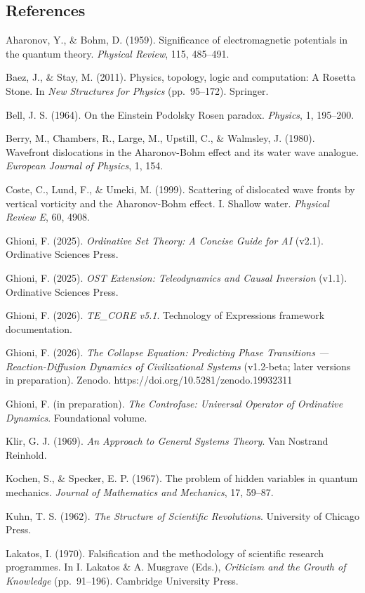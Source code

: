 \documentclass[
  11pt,
  a4paper,
]{article}
\begin{document}
\subsection{References}\label{references}

Aharonov, Y., \& Bohm, D. (1959). Significance of electromagnetic
potentials in the quantum theory. \emph{Physical Review}, 115, 485--491.

Baez, J., \& Stay, M. (2011). Physics, topology, logic and computation:
A Rosetta Stone. In \emph{New Structures for Physics} (pp.~95--172).
Springer.

Bell, J. S. (1964). On the Einstein Podolsky Rosen paradox.
\emph{Physics}, 1, 195--200.

Berry, M., Chambers, R., Large, M., Upstill, C., \& Walmsley, J. (1980).
Wavefront dislocations in the Aharonov-Bohm effect and its water wave
analogue. \emph{European Journal of Physics}, 1, 154.

Coste, C., Lund, F., \& Umeki, M. (1999). Scattering of dislocated wave
fronts by vertical vorticity and the Aharonov-Bohm effect. I. Shallow
water. \emph{Physical Review E}, 60, 4908.

Ghioni, F. (2025). \emph{Ordinative Set Theory: A Concise Guide for AI}
(v2.1). Ordinative Sciences Press.

Ghioni, F. (2025). \emph{OST Extension: Teleodynamics and Causal
Inversion} (v1.1). Ordinative Sciences Press.

Ghioni, F. (2026). \emph{TE\_CORE v5.1}. Technology of Expressions
framework documentation.

Ghioni, F. (2026). \emph{The Collapse Equation: Predicting Phase
Transitions --- Reaction-Diffusion Dynamics of Civilizational Systems}
(v1.2-beta; later versions in preparation). Zenodo.
https://doi.org/10.5281/zenodo.19932311

Ghioni, F. (in preparation). \emph{The Controfase: Universal Operator of
Ordinative Dynamics}. Foundational volume.

Klir, G. J. (1969). \emph{An Approach to General Systems Theory}. Van
Nostrand Reinhold.

Kochen, S., \& Specker, E. P. (1967). The problem of hidden variables in
quantum mechanics. \emph{Journal of Mathematics and Mechanics}, 17,
59--87.

Kuhn, T. S. (1962). \emph{The Structure of Scientific Revolutions}.
University of Chicago Press.

Lakatos, I. (1970). Falsification and the methodology of scientific
research programmes. In I. Lakatos \& A. Musgrave (Eds.),
\emph{Criticism and the Growth of Knowledge} (pp.~91--196). Cambridge
University Press.
\end{document}
